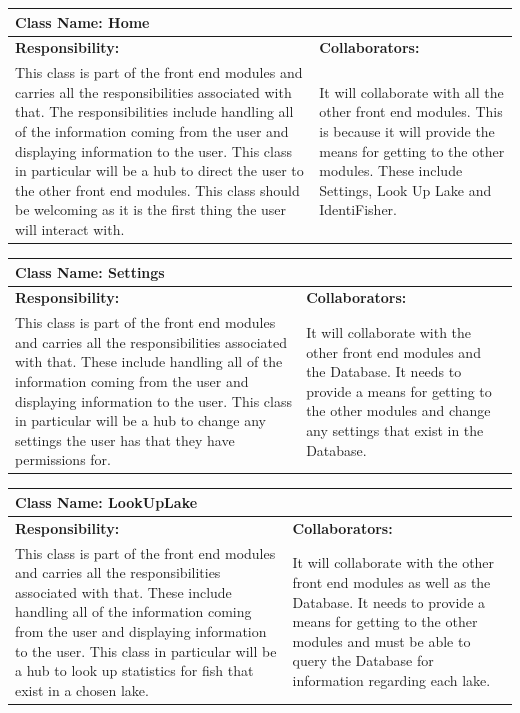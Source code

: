 \documentclass[]{article}
\begin{document}
	\begin{table}[ht]
		\centering
		\begin{tabular}{|p{5cm}|p{5cm}|}
		\hline
		 \multicolumn{2}{|l|}{\textbf{Class Name: Home}} \\
		\hline
		\textbf{Responsibility:} & \textbf{Collaborators:} \\ \hline
		 This class is part of the front end modules and carries all the responsibilities associated with that. The responsibilities include handling all of the information coming from the user and displaying information to the user. This class in particular will be a hub to direct the user to the other front end modules. This class should be welcoming as it is the first thing the user will interact with.& It will collaborate with all the other front end modules. This is because it will provide the means for getting to the other modules. These include Settings, Look Up Lake and IdentiFisher. \\
		\hline
		\end{tabular}
	\end{table}

	\begin{table}[ht]
		\centering
		\begin{tabular}{|p{5cm}|p{5cm}|}
		\hline
		 \multicolumn{2}{|l|}{\textbf{Class Name: Settings}} \\
		\hline
		\textbf{Responsibility:} & \textbf{Collaborators:} \\ \hline
		 This class is part of the front end modules and carries all the responsibilities associated with that. These include handling all of the information coming from the user and displaying information to the user. This class in particular will be a hub to change any settings the user has that they have permissions for. & It will collaborate with the other front end modules and the Database. It needs to provide a means for getting to the other modules and change any settings that exist in the Database. \\
		\hline
		\end{tabular}
	\end{table}

	\begin{table}[ht]
		\centering
		\begin{tabular}{| p{5cm} | p{5cm} |}
		\hline
		 \multicolumn{2}{|l|}{\textbf{Class Name: LookUpLake}} \\
		\hline
		\textbf{Responsibility:} & \textbf{Collaborators:} \\ \hline
		This class is part of the front end modules and carries all the responsibilities associated with that. These include handling all of the information coming from the user and displaying information to the user. This class in particular will be a hub to look up statistics for fish that exist in a chosen lake. & It will collaborate with the other front end modules as well as the Database. It needs to provide a means for getting to the other modules and must be able to query the Database for information regarding each lake. \\
		\hline
		\end{tabular}
	\end{table}
\end{document}
